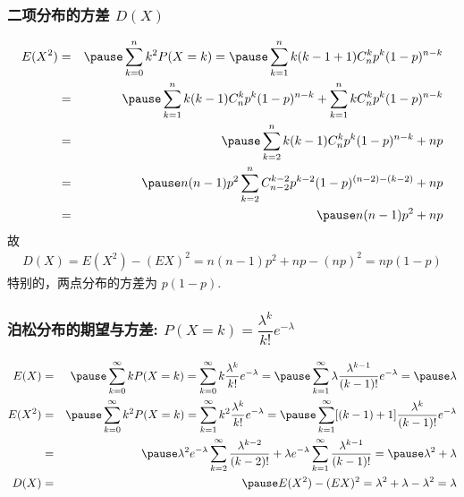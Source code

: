 	\begin{frame}
		\frametitle{二项分布的方差 $D (X)$}
		\vspace{-0.6cm}
		\begin{eqnarray*}
			E(X^2)&=&\pause \sum_{k=0}^nk^2P(X=k)=\pause \sum_{k=1}^nk(k-1+1)C_n^kp^k(1-p)^{n-k}\\
			&=&\pause \sum_{k=1}^{n}k(k-1)C_n^kp^k(1-p)^{n-k}+\sum_{k=1}^{n}kC_n^kp^k(1-p)^{n-k}\\
			&=&\pause \sum_{k=2}^{n}k(k-1)C_n^kp^k(1-p)^{n-k}+np\\
			&=&\pause n(n-1)p^2\sum_{k=2}^nC_{n-2}^{k-2}p^{k-2}(1-p)^{(n-2)-(k-2)}+np\\
			&=&\pause n(n-1)p^2+np
		\end{eqnarray*}
		\pause 故
		\begin{eqnarray*}
			D(X)=E(X^2)-(EX)^2=n(n-1)p^2+np-(np)^2=np(1-p)
		\end{eqnarray*}
		\pause 特别的，两点分布的方差为 $p (1-p)$.
	\end{frame}
	\begin{frame}
		\frametitle{泊松分布的期望与方差: $P (X=k)=\dfrac{\lambda^k}{k!} e^{-\lambda}$}
		\begin{eqnarray*}
			E(X)&=&\pause \sum_{k=0}^\infty k P(X=k)=\sum_{k=0}^\infty k \dfrac{\lambda^k}{k!}e^{-\lambda}=\pause \sum_{k=1}^\infty  \lambda\dfrac{\lambda^{k-1}}{(k-1)!}e^{-\lambda}=\pause \lambda\\
			E(X^2)&=&\pause \sum_{k=0}^\infty k^2 P(X=k)=\sum_{k=1}^\infty k^2 \dfrac{\lambda^k}{k!}e^{-\lambda}=\pause \sum_{k=1}^\infty[(k-1)+1]\dfrac{\lambda^{k}}{(k-1)!}e^{-\lambda}\\
			&=&\pause \lambda^2e^{-\lambda}\sum_{k=2}^\infty \dfrac{\lambda^{k-2}}{(k-2)!}+\lambda e^{-\lambda}\sum_{k=1}^\infty  \dfrac{\lambda^{k-1}}{(k-1)!}=\pause \lambda^2+\lambda\\
			D(X)&=&\pause E(X^2)-(EX)^2=\lambda^2+\lambda-\lambda^2=\lambda
		\end{eqnarray*}

	\end{frame}
